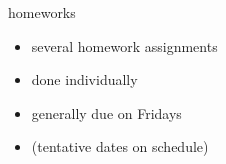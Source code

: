 
\begin{frame}{homeworks}
    \begin{itemize}
    \item several homework assignments
    \item done individually
    \item generally due on Fridays
    \item (tentative dates on schedule)
    \end{itemize}
\end{frame}
